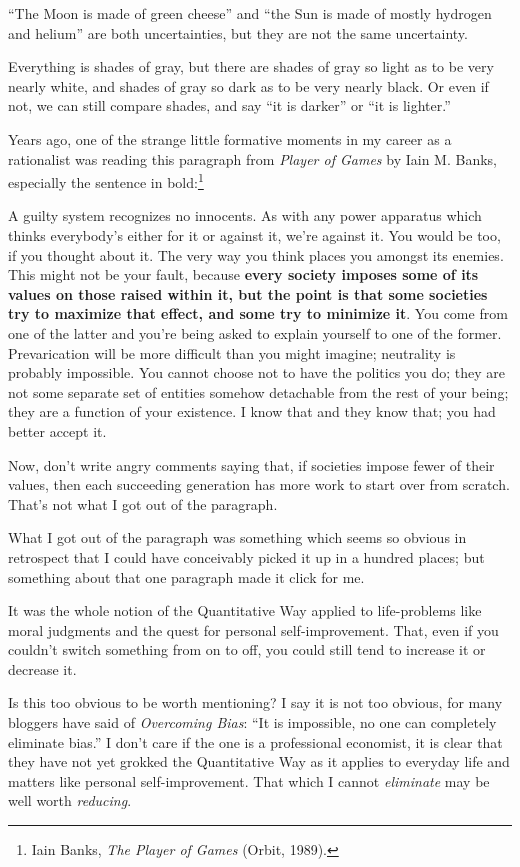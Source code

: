 {
 ``The Moon is made of green
cheese'' and ``the Sun is made of
mostly hydrogen and helium'' are both uncertainties,
but they are not the same uncertainty.}

{
 Everything is shades of gray, but there are shades of gray so
light as to be very nearly white, and shades of gray so dark as to be
very nearly black. Or even if not, we can still compare shades, and say
``it is darker'' or
``it is lighter.''}

{
 Years ago, one of the strange little formative moments in my
career as a rationalist was reading this paragraph from \textit{Player
of Games} by Iain M. Banks, especially the sentence in
bold:\footnote{Iain Banks, \textit{The Player of Games} (Orbit, 1989).}}

{
 A guilty system recognizes no innocents. As with any power
apparatus which thinks everybody's either for it or
against it, we're against it. You would be too, if you
thought about it. The very way you think places you amongst its
enemies. This might not be your fault, because \textbf{every society
imposes some of its values on those raised within it, but the point is
that some societies try to maximize that effect, and some try to
minimize it}. You come from one of the latter and
you're being asked to explain yourself to one of the
former. Prevarication will be more difficult than you might imagine;
neutrality is probably impossible. You cannot choose not to have the
politics you do; they are not some separate set of entities somehow
detachable from the rest of your being; they are a function of your
existence. I know that and they know that; you had better accept it.}

{
 Now, don't write angry comments saying that, if
societies impose fewer of their values, then each succeeding generation
has more work to start over from scratch. That's not
what I got out of the paragraph.}

{
 What I got out of the paragraph was something which seems so
obvious in retrospect that I could have conceivably picked it up in a
hundred places; but something about that one paragraph made it click
for me.}

{
 It was the whole notion of the Quantitative Way applied to
life-problems like moral judgments and the quest for personal
self-improvement. That, even if you couldn't switch
something from on to off, you could still tend to increase it or
decrease it.}

{
 Is this too obvious to be worth mentioning? I say it is not too
obvious, for many bloggers have said of \textit{Overcoming Bias}:
``It is impossible, no one can completely eliminate
bias.'' I don't care if the one is a
professional economist, it is clear that they have not yet grokked the
Quantitative Way as it applies to everyday life and matters like
personal self-improvement. That which I cannot \textit{eliminate} may
be well worth \textit{reducing}.}

